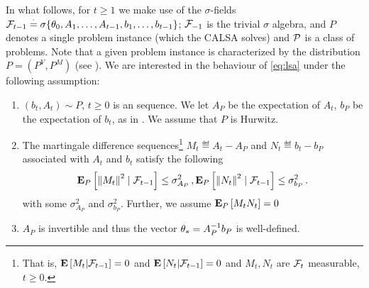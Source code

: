 In what follows, for $t\ge1$ we make use of the $\sigma$-fields $\F_{t-1}\eqdef\sigma\{\theta_0,A_1,\ldots, A_{t-1}, b_1,\ldots, b_{t-1}\}$; $\F_{-1}$ is the trivial $\sigma$ algebra, and $P$ denotes a single problem instance (which the CALSA solves) and $\P$ is a class of problems. Note that a given problem instance is characterized by the distribution $P=(P^V,P^M)$ (see ).
We are interested in the behaviour of \eqref{eq:lsa} under the following assumption:
\begin{assumption}\label{assmp:lsa}
\begin{enumerate}[leftmargin=*, before = \leavevmode\vspace{-\baselineskip}]
\item \label{dist} $(b_t, A_t)\sim P$, $t\geq 0$ is an \iid sequence.
We let $A_P$ be the expectation of $A_t$, $b_P$ be the expectation of $b_t$, as in .
We assume that $P$ is Hurwitz.
\item \label{matvar} The martingale difference sequences\footnote{That is, $\EE{M_t|\F_{t-1}}=0$ and $\EE{N_t|\F_{t-1}}=0$ and $M_t,N_t$ are $\F_t$ measurable, $t\ge 0$.} $M_t\eqdef A_t-A_{P}$ and $N_t\eqdef b_t-b_{P}$ associated with $A_t$ and $b_t$ satisfy the following 
\begin{align*}
	\E_P\left[ \norm{M_t}^2\mid\F_{t-1}\right]\leq \sigma^2_{A_P}\,, 
\E_P\left[\norm{N_t}^2\mid\F_{t-1}\right]\leq\sigma^2_{b_P}\,.
\end{align*}
with some $\sigma^2_{A_P}$ and $\sigma^2_{b_P}$. Further, we assume $\E_P\left[M_t N_t\right]=0$ 
\item $A_P$ is invertible and thus the vector $\ts=A^{-1}_Pb_P$ is well-defined. 
\end{enumerate}
\end{assumption}
